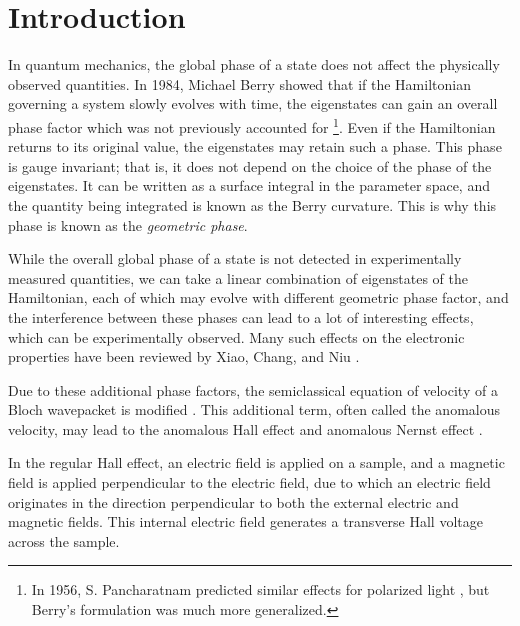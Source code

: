 \documentclass{report}
\begin{document}
\tableofcontents





\chapter{Introduction}
In quantum mechanics, the global phase of a state does not affect the physically observed quantities. In 1984, Michael Berry showed \cite{BerryQuantalPhase1984} that if the Hamiltonian governing a system slowly evolves with time, the eigenstates can gain an overall phase factor which was not previously accounted for \footnote{In 1956, S. Pancharatnam predicted similar effects for polarized light \cite{Pancharatnam1956}, but Berry's formulation was much more generalized.}. Even if the Hamiltonian returns to its original value, the eigenstates may retain such a phase. This phase is gauge invariant; that is, it does not depend on the choice of the phase of the eigenstates. It can be written as a surface integral in the parameter space, and the quantity being integrated is known as the Berry curvature. This is why this phase is known as the \textit{geometric phase}.

While the overall global phase of a state is not detected in experimentally measured quantities, we can take a linear combination of eigenstates of the Hamiltonian, each of which may evolve with different geometric phase factor, and the interference between these phases can lead to a lot of interesting effects, which can be experimentally observed. Many such effects on the electronic properties have been reviewed by Xiao, Chang, and Niu \cite{XiaoElecPropertiesReview2010}.

Due to these additional phase factors, the semiclassical equation of velocity of a Bloch wavepacket is modified \cite{chang1995, chang1996, SundaramNiu1999}. This additional term, often called the anomalous velocity, may lead to the anomalous Hall effect \cite{AnomalousHallReviewNagosa2010} and anomalous Nernst effect \cite{NernstReviewBehnia_2016}.

In the regular Hall effect, an electric field is applied on a sample, and a magnetic field is applied perpendicular to the electric field, due to which an electric field originates in the direction perpendicular to both the external electric and magnetic fields. This internal electric field generates a transverse Hall voltage across the sample.
\end{document}
